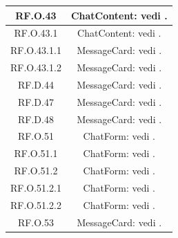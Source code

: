 \documentclass[10pt, a4paper]{article}
\begin{document}
\begin{xltabular}{\textwidth}{c|c}
\hline
RF.O.43 & ChatContent: vedi .\\%
\hline
RF.O.43.1 & ChatContent: vedi .\\ %
\hline
RF.O.43.1.1 &  MessageCard: vedi .\\%
\hline
RF.O.43.1.2 & MessageCard: vedi .\\ %
\hline
RF.D.44 & MessageCard: vedi .\\%
\hline
RF.D.47 &  MessageCard: vedi .\\ %
\hline
RF.D.48 & MessageCard: vedi .\\%
\hline
RF.O.51 & ChatForm: vedi .\\ %
\hline
RF.O.51.1 & ChatForm: vedi .\\%
\hline
RF.O.51.2 & ChatForm: vedi . \\%
\hline
RF.O.51.2.1 & ChatForm: vedi . \\ %
\hline
RF.O.51.2.2& ChatForm: vedi . \\%
\hline
RF.O.53 & MessageCard: vedi .\\ %
\end{xltabular}
\end{document}
